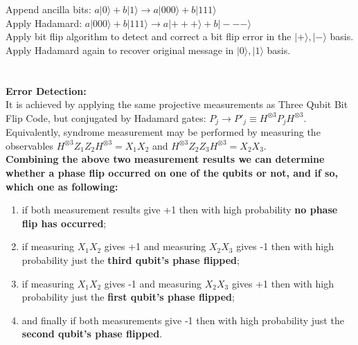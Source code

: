 \documentclass[12pt]{report}
\begin{document}
Append ancilla bits: $a |0\rangle + b |1\rangle \to a |000\rangle + b |111\rangle$\\
Apply Hadamard: $a |000\rangle + b |111\rangle \to a |+ + +\rangle + b |- - -\rangle$\\
Apply bit flip algorithm to detect and correct a bit flip error in the $|+\rangle, |-\rangle$ basis.\\
Apply Hadamard again to recover original message in $|0\rangle, |1\rangle$ basis. \\
\\
\\
\textbf{Error Detection:}\\
It is achieved by applying the same projective measurements as Three Qubit Bit Flip Code, but conjugated by Hadamard gates: $P_j \to {P'}_j \equiv H^{\otimes 3}P_jH^{\otimes 3}$. Equivalently, syndrome measurement may be performed by measuring the observables $H^{\otimes 3}Z_1Z_2H^{\otimes 3} = X_1X_2$ and $H^{\otimes 3}Z_2Z_3H^{\otimes 3} = X_2X_3$.\\
\textbf{Combining the above two measurement results we can determine whether a phase flip occurred on one of the qubits or not, and if so, which one as following:} 
\begin{enumerate}
\item if both measurement results give +1 then with high probability \textbf{no phase flip has occurred}; 
\item if measuring $X_1X_2$ gives +1 and measuring $X_2X_3$ gives -1 then with high probability just the \textbf{third qubit's phase flipped}; 
\item if measuring $X_1X_2$ gives -1 and measuring $X_2X_3$ gives +1 then with high probability just the \textbf{first qubit's phase flipped};
\item and finally if both measurements give -1 then with high probability just the \textbf{second qubit's phase flipped}.
\end{enumerate}
\end{document}
